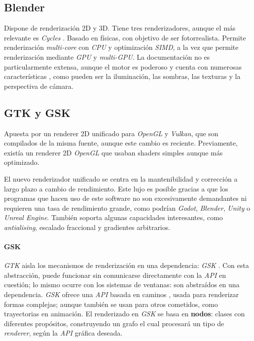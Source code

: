 \subsection{Blender}
Dispone de renderización 2D y 3D. Tiene tres renderizadores, aunque el más relevante es \textit{Cycles} \cite{webBlenderCyclesDocs}. Basado en físicas, con objetivo de ser fotorrealista. Permite renderización \textit{multi-core} con \textit{CPU} y optimización \textit{SIMD}, a la vez que permite renderización mediante \textit{GPU} y \textit{multi-GPU}. La documentación no es particularmente extensa, aunque el motor es poderoso y cuenta con numerosas características \cite{webBlenderCyclesFeatures}, como pueden ser la iluminación, las sombras, las texturas y la perspectiva de cámara.

\subsection{GTK y GSK}
Apuesta por un renderer 2D unificado para \textit{OpenGL} y \textit{Vulkan}, que son compilados de la misma fuente, aunque este cambio es reciente. Previamente, existía un renderer 2D \textit{OpenGL} que usaban shaders simples aunque más optimizado.

El nuevo renderizador unificado se centra en la mantenibilidad y corrección a largo plazo a cambio de rendimiento. Este lujo es posible gracias a que los programas que hacen uso de este software no son excesivamente demandantes ni requieren una tasa de rendimiento grande, como podrían \textit{Godot}, \textit{Blender}, \textit{Unity} o \textit{Unreal Engine}. También soporta algunas capacidades interesantes, como \textit{antialising}, escalado fraccional y gradientes arbitrarios. 

\paragraph{GSK}

\textit{GTK} \cite{webGTKDocs} aisla los mecanismos de renderización en una dependencia: \textit{GSK} \cite{webGSKDocs}. Con esta abstracción, puede funcionar sin comunicarse directamente con la \textit{API} en cuestión; lo mismo ocurre con los sistemas de ventanas: son abstraídos en una dependencia. \textit{GSK} ofrece una \textit{API} basada en caminos \cite{webGSKPathAPI}, usada para renderizar formas complejas; aunque también se usan para otros cometidos, como trayectorias en animación. El renderizado en \textit{GSK} se basa en \textbf{nodos}: clases con diferentes propósitos, construyendo un grafo el cual procesará un tipo de \textit{renderer}, según la \textit{API} gráfica deseada.

